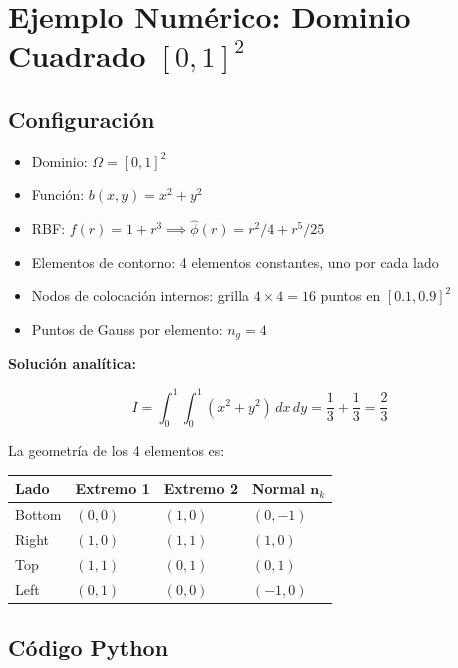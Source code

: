 \documentclass[12pt,a4paper]{article}
\begin{document}
\section{Ejemplo Numérico: Dominio Cuadrado $[0,1]^2$}

\subsection{Configuración}

\begin{itemize}
    \item Dominio: $\Omega = [0,1]^2$
    \item Función: $b(x,y) = x^2 + y^2$
    \item RBF: $f(r) = 1 + r^3 \implies \hat{\phi}(r) = r^2/4 + r^5/25$
    \item Elementos de contorno: 4 elementos constantes, uno por cada lado
    \item Nodos de colocación internos: grilla $4\times 4 = 16$ puntos en
    $[0.1, 0.9]^2$
    \item Puntos de Gauss por elemento: $n_g = 4$
\end{itemize}

\textbf{Solución analítica:}

\begin{equation}
    I = \int_0^1\int_0^1 (x^2+y^2)\,dx\,dy
    = \frac{1}{3} + \frac{1}{3} = \frac{2}{3}
\end{equation}

La geometría de los 4 elementos es:

\begin{center}
\begin{tabular}{llll}
\toprule
Lado & Extremo 1 & Extremo 2 & Normal $\mathbf{n}_k$ \\
\midrule
Bottom & $(0,0)$ & $(1,0)$ & $(0,-1)$ \\
Right  & $(1,0)$ & $(1,1)$ & $(1,0)$  \\
Top    & $(1,1)$ & $(0,1)$ & $(0,1)$  \\
Left   & $(0,1)$ & $(0,0)$ & $(-1,0)$ \\
\bottomrule
\end{tabular}
\end{center} 

\subsection{Código Python}
\end{document}

